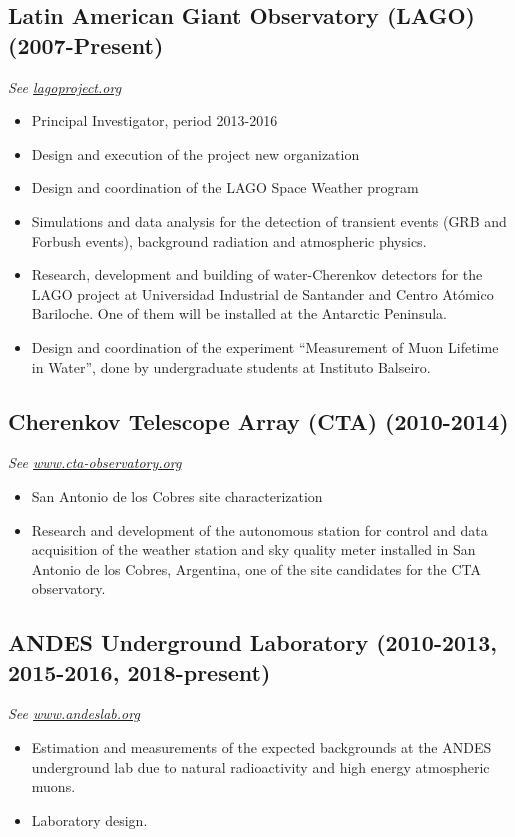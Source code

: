 \subsection*{Latin American Giant Observatory (LAGO) (2007-Present)}
{\small{\textit{See \href{http://lagoproject.org}{lagoproject.org}}}}
\begin{itemize}
\item Principal Investigator, period 2013-2016
\item Design and execution of the project new organization
\item Design and coordination of the LAGO Space Weather program 
\item Simulations and data analysis for the detection of transient events
(GRB and Forbush events), background radiation and atmospheric physics.
\item Research, development and building of water-Cherenkov detectors for the
	LAGO project at Universidad Industrial de Santander and Centro Atómico
	Bariloche. One of them will be
installed at the Antarctic Peninsula.
\item Design and coordination of the experiment ``Measurement of Muon Lifetime in Water'', done by undergraduate students at Instituto Balseiro.
\end{itemize}

\subsection*{Cherenkov Telescope Array (CTA) (2010-2014)}
{\small{\textit{See \href{http://www.cta-observatory.org}{www.cta-observatory.org}}}}
\begin{itemize}
\item San Antonio de los Cobres site characterization
\item Research and development of the autonomous station for control and data
acquisition of the weather station and sky quality meter installed in San
Antonio de los Cobres, Argentina, one of the site candidates for the CTA
observatory.
\end{itemize}

\subsection*{ANDES Underground Laboratory (2010-2013, 2015-2016, 2018-present)}
{\small{\textit{See \href{http://www.andeslab.org}{www.andeslab.org}}}}
\begin{itemize}
\item Estimation and measurements of the expected backgrounds at the ANDES
underground lab due to natural radioactivity and high energy atmospheric muons.
\item Laboratory design.
\end{itemize}

